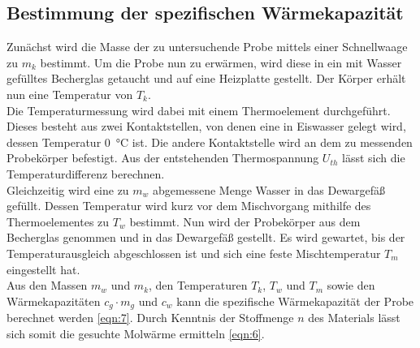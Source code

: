 \subsection{Bestimmung der spezifischen Wärmekapazität}
Zunächst wird die Masse der zu untersuchende Probe mittels einer Schnellwaage zu $m_k$ bestimmt.
Um die Probe nun zu erwärmen, wird diese in ein mit Wasser gefülltes Becherglas getaucht und auf eine Heizplatte gestellt.
Der Körper erhält nun eine Temperatur von $T_k$. \\
Die Temperaturmessung wird dabei mit einem Thermoelement durchgeführt.
Dieses besteht aus zwei Kontaktstellen, von denen eine in Eiswasser gelegt wird, dessen Temperatur \SI{0}{\celsius} ist.
Die andere Kontaktstelle wird an dem zu messenden Probekörper befestigt.
Aus der entstehenden Thermospannung $U_{th}$ lässt sich die Temperaturdifferenz berechnen. \\
Gleichzeitig wird eine zu $m_w$ abgemessene Menge Wasser in das Dewargefäß gefüllt.
Dessen Temperatur wird kurz vor dem Mischvorgang mithilfe des Thermoelementes zu $T_w$ bestimmt.
Nun wird der Probekörper aus dem Becherglas genommen und in das Dewargefäß gestellt.
Es wird gewartet, bis der Temperaturausgleich abgeschlossen ist und sich eine feste Mischtemperatur $T_m$ eingestellt hat. \\
Aus den Massen $m_w$ und $m_k$, den Temperaturen $T_k$, $T_w$ und $T_m$ sowie den Wärmekapazitäten $c_g \cdot m_g$ und $c_w$ kann die spezifische Wärmekapazität der Probe berechnet werden \ref{eqn:7}.
Durch Kenntnis der Stoffmenge $n$ des Materials lässt sich somit die gesuchte Molwärme ermitteln \ref{eqn:6}.  \\
